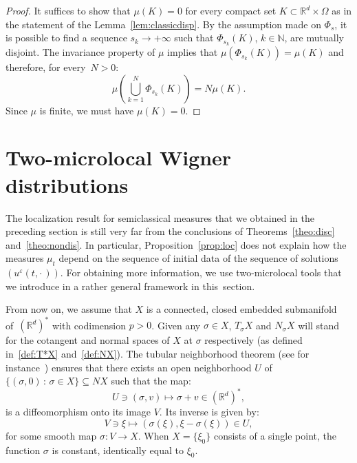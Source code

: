 \documentclass[10pt]{amsart}
\theoremstyle{definition}
\newcommand*\R{{\mathbb R}}
\newcommand*\N{{\mathbb N}}
\newcommand*\eps{\varepsilon}
\numberwithin{equation}{section}
\begin{document}
\begin{proof}
It suffices to show that $\mu(K)=0$ for every compact set $K\subset\R^d\times\Omega$ as in the statement of the Lemma~\ref{lem:classicdisp}. By the assumption made on $\Phi_s$, it is possible to find a sequence $s_k\to+\infty$ such that $\Phi_{s_k}(K)$, $k\in\N$, are mutually disjoint. The invariance property of $\mu$ implies that $\mu(\Phi_{s_k}(K))=\mu(K)$ and therefore, for every~$N>0$:
\[
\mu\left(\bigcup_{k=1}^N\Phi_{s_k}(K)\right)=N\mu(K).
\]
Since $\mu$ is finite, we must have $\mu(K)=0$.
\end{proof}



\section{Two-microlocal Wigner distributions}\label{sec:two_microlocal}

The localization result for semiclassical measures that we obtained in the preceding section is still very far from the conclusions of Theorems~\ref{theo:disc} and~\ref{theo:nondis}. In particular, Proposition~\ref{prop:loc} does not explain how the measures $\mu_t$ depend on the sequence of initial data of the sequence of solutions $(u^\eps(t,\cdot\,))$. For obtaining more information, we use two-microlocal tools that we introduce in a rather general framework in this~section.



From now on, we assume that $X$ is a connected, closed embedded submanifold of~$(\R^d)^*$ with codimension $p>0$. Given any $\sigma\in X$, $T_\sigma X$ and $N_\sigma X$ will stand for the cotangent and normal spaces of $X$ at $\sigma$ respectively (as defined in~\eqref{def:T*X} and~\eqref{def:NX}). The tubular neighborhood theorem (see for instance~\cite{Hirsch}) ensures that there exists an open neighborhood $U$ of $\{(\sigma,0)\,:\,\sigma\in X\}\subseteq N X$ such that the map:
\[
U\ni (\sigma,v)\longmapsto \sigma+v\in(\R^d)^*,
\]
is a diffeomorphism onto its image $V$. Its inverse is given by:
\[
V\ni\xi \longmapsto (\sigma(\xi),\xi-\sigma(\xi))\in U,
\]
for some smooth map $\sigma:V\longrightarrow X$. When $X=\{\xi_0\}$ consists of a single point, the function $\sigma$ is constant, identically equal to $\xi_0$.

\end{document}
